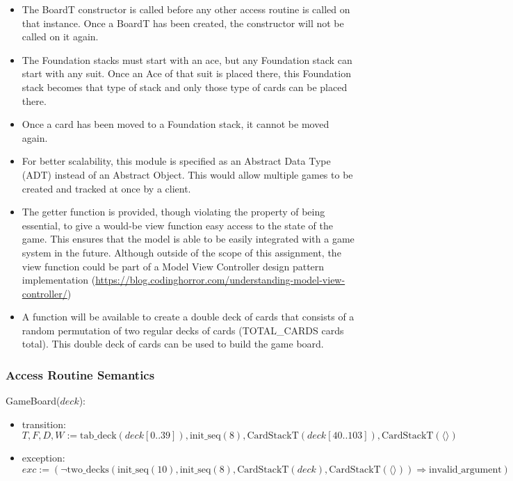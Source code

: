 \documentclass[12pt]{article}
\begin{document}
\begin{itemize}

\item The BoardT constructor is called before any other access
  routine is called on that instance. Once a BoardT has been created, the
  constructor will not be called on it again.

\item The Foundation stacks must start with an ace, but any Foundation stack can
  start with any suit. Once an Ace of that suit is placed there, this Foundation
  stack becomes that type of stack and only those type of cards can be placed
  there.

\item Once a card has been moved to a Foundation stack, it cannot be moved again.

\item For better scalability, this module is specified as an Abstract Data Type
  (ADT) instead of an Abstract Object. This would allow multiple games to be
  created and tracked at once by a client.

\item The getter function is provided, though violating the property of being
  essential, to give a would-be view function easy access to the state of the
  game. This ensures that the model is able to be easily integrated with a game
  system in the future.  Although outside of the scope of this assignment, the
  view function could be part of a Model View Controller design pattern implementation
  (\url{https://blog.codinghorror.com/understanding-model-view-controller/})

\item A function will be available to create a double deck of cards that
  consists of a random permutation of two regular decks of cards (TOTAL\_CARDS
  cards total).  This double deck of cards can be used to build the game board.

\end{itemize}

\subsubsection* {Access Routine Semantics}

\noindent GameBoard($\mathit{deck}$):
\begin{itemize}
\item transition: 
$$T, F, D, W := \text{tab\_deck}(\mathit{deck}[0..39]),
  \text{init\_seq}(8), \text{CardStackT}(\mathit{deck}[40..103]),
  \text{CardStackT}(\langle \rangle)$$
\item exception: $exc := (\lnot \text{two\_decks}(\text{init\_seq}(10),
  \text{init\_seq}(8), \text{CardStackT}(\mathit{deck}),
  \text{CardStackT}(\langle \rangle) ) \Rightarrow \text{invalid\_argument})$
\end{itemize}
\end{document}
